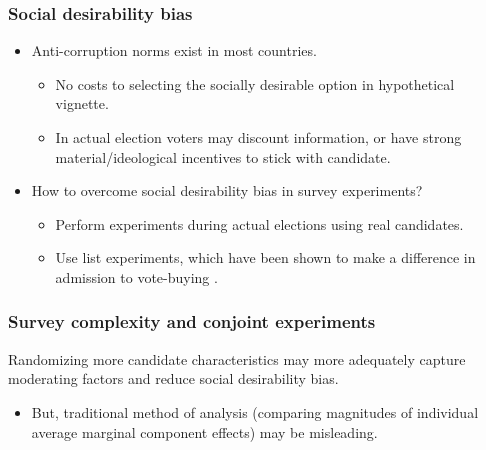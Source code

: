 \documentclass[usenames,dvipsnames]{beamer}
\begin{document}
\begin{frame}
\frametitle{Social desirability bias}
\begin{itemize}
\pause
\item Anti-corruption norms exist in most countries.
\begin{itemize}
\pause
\item No costs to selecting the socially desirable option in hypothetical vignette. 
\pause
\item In actual election voters may discount information, or have strong material/ideological incentives to stick with candidate.
\end{itemize}
\pause
\item How to overcome social desirability bias in survey experiments?
\begin{itemize}
\pause
\item Perform experiments during \textcolor{Cerulean}{actual elections} using real candidates.
\pause
\item Use \textcolor{Cerulean}{list experiments}, which have been shown to make a difference in admission to vote-buying \citep{gonzalez2012vote}.
\end{itemize}
\end{itemize}

\end{frame}

\begin{frame}
\frametitle{Survey complexity and conjoint experiments}
Randomizing more candidate characteristics may more adequately capture moderating factors and reduce social desirability bias.
\begin{itemize}
\pause
\item But, traditional method of analysis (comparing magnitudes of individual average marginal component effects) may be misleading. 
\end{itemize}

\end{frame}
\end{document}

